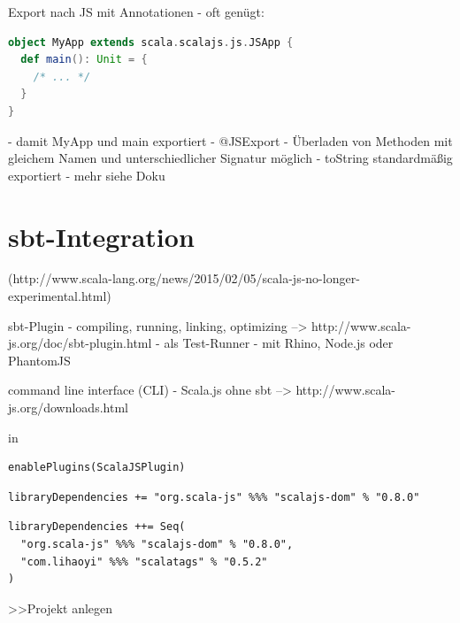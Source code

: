 \documentclass[a4paper, 12pt, hidelinks, listof=totoc, listoftables=totoc, bibliography=totoc]{scrreprt}
\begin{document}
Export nach JS mit Annotationen
- oft genügt:
\begin{lstlisting}[language=Scala]
object MyApp extends scala.scalajs.js.JSApp {
  def main(): Unit = {
  	/* ... */
  }
}
\end{lstlisting}
	- damit MyApp und main exportiert
- @JSExport
	- Überladen von Methoden mit gleichem Namen und unterschiedlicher Signatur möglich
- toString standardmäßig exportiert
- mehr siehe Doku









\section{sbt-Integration}

(http://www.scala-lang.org/news/2015/02/05/scala-js-no-longer-experimental.html)

sbt-Plugin
  - compiling, running, linking, optimizing --> http://www.scala-js.org/doc/sbt-plugin.html
  - als Test-Runner - mit Rhino, Node.js oder PhantomJS

command line interface (CLI)
  - Scala.js ohne sbt  -->  http://www.scala-js.org/downloads.html



in
\begin{lstlisting}
enablePlugins(ScalaJSPlugin)
\end{lstlisting}

\begin{lstlisting}
libraryDependencies += "org.scala-js" %%% "scalajs-dom" % "0.8.0"
\end{lstlisting}

\begin{lstlisting}
libraryDependencies ++= Seq(
  "org.scala-js" %%% "scalajs-dom" % "0.8.0",
  "com.lihaoyi" %%% "scalatags" % "0.5.2"
)
\end{lstlisting}















>>Projekt anlegen

\end{document}
